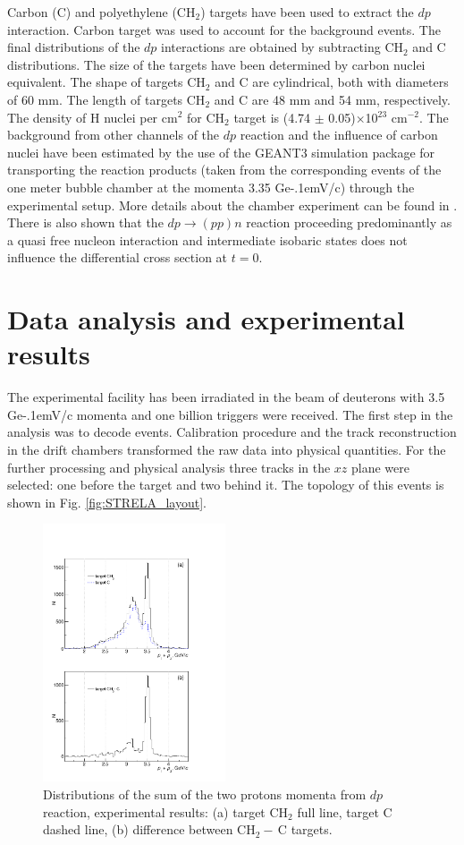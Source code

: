 \documentclass[twocolumn,epjc3]{svjour3}
\newcommand{\dpchex} {\ensuremath{dp \rightarrow (pp)n}\xspace}
\newcommand{\GeVc}   {Ge\kern-.1emV/c\xspace}
\begin{document}
Carbon (C) and polyethylene (CH$_2$) targets have been used to extract the $dp$
interaction. Carbon target was used to account for the background events. The
final distributions of the $dp$ interactions are obtained by subtracting CH$_2$
and C distributions. The size of the targets have been determined by carbon
nuclei equivalent. The shape of targets CH$_2$ and C are cylindrical, both with
diameters of 60 mm. The length of targets CH$_2$ and C are 48 mm and 54 mm,
respectively. The density of H nuclei per cm$^2$ for CH$_2$ target is (4.74
$\pm$ 0.05)$\times$10$^{23}$ cm$^{-2}$. The background from other channels of
the $dp$ reaction and the influence of carbon nuclei have been estimated by the
use of the GEANT3 simulation package for transporting the reaction products
(taken from the corresponding events of the one meter bubble chamber at the
momenta 3.35 \GeVc) through the experimental setup. More details about the
chamber experiment can be found in \cite{gla02,gla08}. There is also shown that
the \dpchex reaction proceeding predominantly as a quasi free nucleon
interaction and intermediate isobaric states does not influence the differential
cross section at $t = 0$.

\section{Data analysis and experimental results}
The experimental facility has been irradiated in the beam of deuterons with 3.5
\GeVc momenta and one billion triggers were received. The first step in the
analysis was to decode events. Calibration procedure and the track
reconstruction in the drift chambers transformed the raw data into physical
quantities. For the further processing and physical analysis three tracks in the
$xz$ plane were selected: one before the target and two behind it.  The topology
of this events is shown in Fig. \ref{fig:STRELA_layout}.

\begin{figure}[h]
  \centering
  \includegraphics[width=0.48\textwidth]{p1_plus_p2_1.pdf}
  \caption{Distributions of the sum of the two protons momenta from $dp$
    reaction, experimental results: (a) target CH$_2$ full line, target C dashed
    line, (b) difference between CH$_2-$\,C targets.}
  \label{fig:p1p2exp}
\end{figure}
\end{document}
